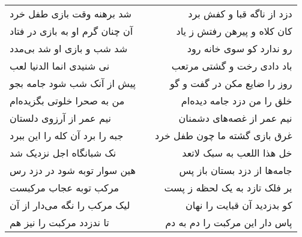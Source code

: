 \begin{center}
\begin{longtable}{l p{0.5cm} r}
شد برهنه وقت بازی طفل خرد
&&
دزد از ناگه قبا و کفش برد
\\
آن چنان گرم او به بازی در فتاد
&&
کان کلاه و پیرهن رفتش ز یاد
\\
شد شب و بازی او شد بی‌مدد
&&
رو ندارد کو سوی خانه رود
\\
نی شنیدی انما الدنیا لعب
&&
باد دادی رخت و گشتی مرتعب
\\
پیش از آنک شب شود جامه بجو
&&
روز را ضایع مکن در گفت و گو
\\
من به صحرا خلوتی بگزیده‌ام
&&
خلق را من دزد جامه دیده‌ام
\\
نیم عمر از آرزوی دلستان
&&
نیم عمر از غصه‌های دشمنان
\\
جبه را برد آن کله را این ببرد
&&
غرق بازی گشته ما چون طفل خرد
\\
نک شبانگاه اجل نزدیک شد
&&
خل هذا اللعب به سبک لاتعد
\\
هین سوار توبه شود در دزد رس
&&
جامه‌ها از دزد بستان باز پس
\\
مرکب توبه عجاب مرکبست
&&
بر فلک تازد به یک لحظه ز پست
\\
لیک مرکب را نگه می‌دار از آن
&&
کو بدزدید آن قبایت را نهان
\\
تا ندزدد مرکبت را نیز هم
&&
پاس دار این مرکبت را دم به دم
\\
\end{longtable}
\end{center}
